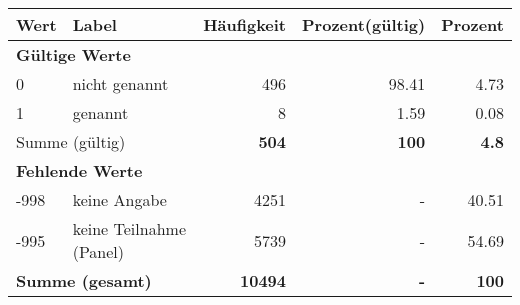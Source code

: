      \begin{longtable}{lXrrr}
     \toprule
     \textbf{Wert} & \textbf{Label} & \textbf{Häufigkeit} & \textbf{Prozent(gültig)} & \textbf{Prozent} \\
     \endhead
     \midrule
     \multicolumn{5}{l}{\textbf{Gültige Werte}}\\

     0 &
     \multicolumn{1}{X}{ nicht genannt   } &


       \num{496} &
       \num[round-mode=places,round-precision=2]{98,41} &
         \num[round-mode=places,round-precision=2]{4,73} \\

     1 &
     \multicolumn{1}{X}{ genannt   } &


       \num{8} &
       \num[round-mode=places,round-precision=2]{1,59} &
         \num[round-mode=places,round-precision=2]{0,08} \\
     \midrule
     \multicolumn{2}{l}{Summe (gültig)} &
       \textbf{\num{504}} &
     \textbf{100} &
       \textbf{\num[round-mode=places,round-precision=2]{4,8}} \\
     \multicolumn{5}{l}{\textbf{Fehlende Werte}}\\
       -998 &
       keine Angabe &
         \num{4251} &
        - &
         \num[round-mode=places,round-precision=2]{40,51} \\
       -995 &
       keine Teilnahme (Panel) &
         \num{5739} &
        - &
         \num[round-mode=places,round-precision=2]{54,69} \\
     \midrule
     \multicolumn{2}{l}{\textbf{Summe (gesamt)}} &
          \textbf{\num{10494}} &
        \textbf{-} &
        \textbf{100} \\
     \bottomrule
     \end{longtable}
     
